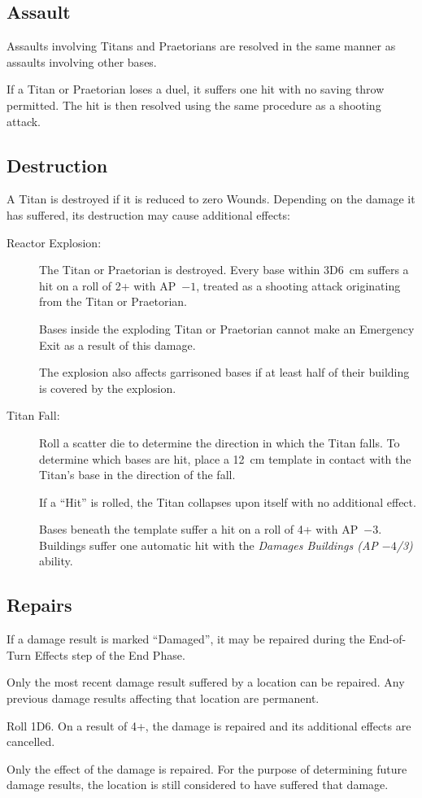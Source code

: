 \subsection{Assault}

Assaults involving Titans and Praetorians are resolved in the same manner as assaults involving other bases.

If a Titan or Praetorian loses a duel, it suffers one hit with no saving throw permitted. The hit is then resolved using the same procedure as a shooting attack.

\subsection{Destruction}

A Titan is destroyed if it is reduced to zero Wounds. Depending on the damage it has suffered, its destruction may cause additional effects:

\begin{description}
    \item[Reactor Explosion:] The Titan or Praetorian is destroyed. Every base within 3D6~cm suffers a hit on a roll of 2+ with AP~$-1$, treated as a shooting attack originating from the Titan or Praetorian.

    Bases inside the exploding Titan or Praetorian cannot make an Emergency Exit as a result of this damage.

    The explosion also affects garrisoned bases if at least half of their building is covered by the explosion.

    \item[Titan Fall:] Roll a scatter die to determine the direction in which the Titan falls. To determine which bases are hit, place a 12~cm template in contact with the Titan's base in the direction of the fall.

    If a ``Hit'' is rolled, the Titan collapses upon itself with no additional effect.

    Bases beneath the template suffer a hit on a roll of 4+ with AP~$-3$. Buildings suffer one automatic hit with the \textit{Damages Buildings (AP $-4$/3)} ability.
\end{description}

\subsection{Repairs}

If a damage result is marked ``Damaged'', it may be repaired during the End-of-Turn Effects step of the End Phase.

Only the most recent damage result suffered by a location can be repaired. Any previous damage results affecting that location are permanent.

Roll 1D6. On a result of 4+, the damage is repaired and its additional effects are cancelled.

Only the effect of the damage is repaired. For the purpose of determining future damage results, the location is still considered to have suffered that damage.
